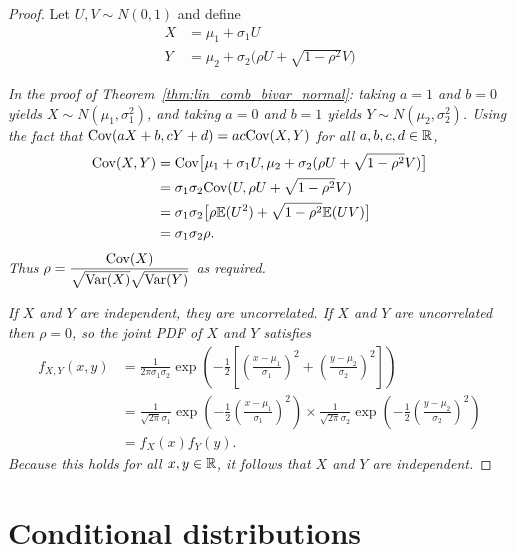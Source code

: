 \begin{proof}
Let $U,V\sim N(0,1)$ and define
\begin{align*}
X & = \mu_1 + \sigma_1 U \\
Y & = \mu_2 + \sigma_2\big(\rho U +\sqrt{1-\rho^2}V\big)
\end{align*}


\ben
\it %
In the proof of Theorem~\ref{thm:lin_comb_bivar_normal}:
\bit 
\it taking $a=1$ and $b=0$ yields $X\sim N(\mu_1,\sigma_1^2)$, and
\it taking $a=0$ and $b=1$ yields $Y\sim N(\mu_2,\sigma_2^2)$.
\eit
\it %
Using the fact that $\text{Cov}(aX+b,cY+d)=ac\text{Cov}(X,Y)$ for all $a,b,c,d\in\mathbb{R}$,
\begin{align*}
\text{Cov}(X,Y)
	& = \text{Cov}\big[\mu_1 + \sigma_1 U, \mu_2 + \sigma_2(\rho U + \sqrt{1-\rho^2}V)\big] \\
	& = \sigma_1\sigma_2\text{Cov}(U, \rho U + \sqrt{1-\rho^2}V) \\
	& = \sigma_1\sigma_2\big[\rho\mathbb{E}(U^2) + \sqrt{1-\rho^2}\mathbb{E}(UV)\big] \\
	& = \sigma_1\sigma_2\rho.
\end{align*}
Thus $\rho = \displaystyle\frac{\text{Cov}(X)}{\sqrt{\text{Var}(X)}\sqrt{\text{Var}(Y)}}$ as required.


\it %
If $X$ and $Y$ are independent, they are uncorrelated. If $X$ and $Y$ are uncorrelated then $\rho=0$, so the joint PDF of $X$ and $Y$ satisfies
\begin{align*}
f_{X,Y}(x,y)
	& = \frac{1}{2\pi\sigma_1\sigma_2}\exp\left(-\frac{1}{2}\left[\left(\frac{x-\mu_1}{\sigma_1}\right)^2 + \left(\frac{y-\mu_2}{\sigma_2}\right)^2 \right]\right) \\
	& = \frac{1}{\sqrt{2\pi}\sigma_1}\exp\left(-\frac{1}{2}\left(\frac{x-\mu_1}{\sigma_1}\right)^2\right)
			\times \frac{1}{\sqrt{2\pi}\sigma_2}\exp\left(-\frac{1}{2}\left(\frac{y-\mu_2}{\sigma_2}\right)^2\right) \\
	& = f_X(x)f_Y(y).		
\end{align*}
Because this holds for all $x,y\in\mathbb{R}$, it follows that $X$ and $Y$ are independent. 
\een
\end{proof}

\section{Conditional distributions} 

